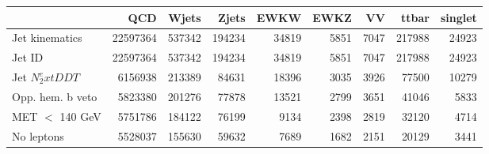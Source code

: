 \begin{tabular}{lrrrrrrrr}
\toprule
 & QCD & Wjets & Zjets & EWKW & EWKZ & VV & ttbar & singlet \\
\midrule
Jet kinematics & 22597364 & 537342 & 194234 & 34819 & 5851 & 7047 & 217988 & 24923 \\
Jet ID & 22597364 & 537342 & 194234 & 34819 & 5851 & 7047 & 217988 & 24923 \\
Jet $N_2^	ext{DDT}$ & 6156938 & 213389 & 84631 & 18396 & 3035 & 3926 & 77500 & 10279 \\
Opp. hem. b veto & 5823380 & 201276 & 77878 & 13521 & 2799 & 3651 & 41046 & 5833 \\
MET $<$ 140 GeV & 5751786 & 184122 & 76199 & 9134 & 2398 & 2819 & 32120 & 4714 \\
No leptons & 5528037 & 155630 & 59632 & 7689 & 1682 & 2151 & 20129 & 3441 \\
\bottomrule
\end{tabular}
